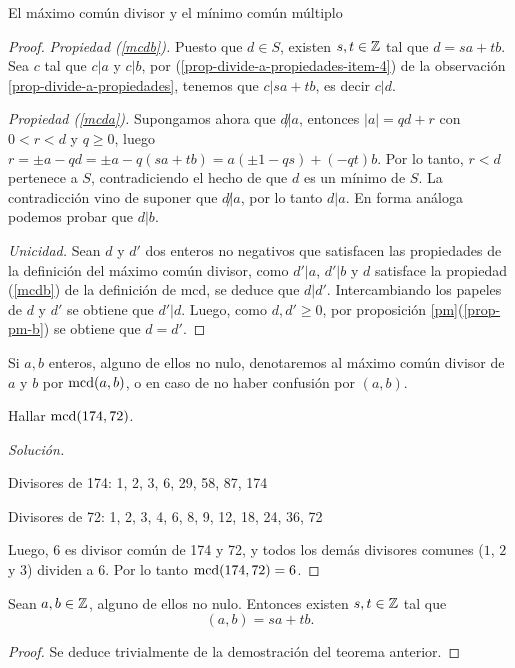 \begin{section}{El máximo común divisor y el mínimo común
múltiplo}
\begin{proof}
	\textit{Propiedad {(\ref{mcdb})}.} Puesto  que $d \in S$,  existen $s, t \in {\mathbb Z}$ tal que $d = sa+tb$. Sea $c$ tal que $c|a$ y $c|b$, por (\ref{prop-divide-a-propiedades-item-4}) de la observación \ref{prop-divide-a-propiedades},  tenemos que $c|sa+tb$,  es decir $c|d$. 
	
	\textit{Propiedad {(\ref{mcda})}.} Supongamos ahora que $d \not| a$,  entonces $|a| = qd + r$ con $0 < r <d$ y $q \ge 0$, luego $r = \pm a - qd = \pm a-q(sa+tb) = a(\pm1-qs) +(-qt)b$. Por lo tanto,  $r < d$  pertenece a $S$, contradiciendo  el hecho de que $d$  es un mínimo de $S$. La contradicción vino de suponer que  $d \not| a$, por lo tanto $d|a$. En  forma análoga podemos probar que $d|b$. 
	
	
	\textit{Unicidad.} Sean $d$ y $d'$ dos enteros no negativos que satisfacen las propiedades de la definición del máximo común divisor, como $d'|a$, $d'|b$ y  $d$ satisface la propiedad {(\ref{mcdb})} de la definición de mcd, se deduce que $d|d'$. Intercambiando  los papeles de $d$ y $d'$ se obtiene que $d'|d$. Luego, como $d,d'\ge 0$, por  proposición \ref{pm}(\ref{prop-pm-b}) se obtiene que $d=d'$.
\end{proof}

Si $a,b$ enteros,  alguno de ellos  no nulo,  denotaremos al máximo común divisor  de $a$ y $b$ por $\operatorname{mcd}(a,b)$, o en caso de no haber confusión por $(a,b)$.



\begin{ejemplo} Hallar   $\operatorname{mcd}(174,72)$.
	\begin{proof}[Solución] ${^{}}$
		
		Divisores de 174: 1, 2, 3, 6, 29, 58, 87, 174
		
		Divisores de 72: 1, 2, 3, 4, 6, 8, 9, 12, 18, 24, 36, 72 
		
		Luego, $6$ es divisor común de 174 y 72, y todos los demás divisores comunes ($1$, $2$ y $3$) dividen a $6$. Por lo tanto $\operatorname{mcd}(174,72) =6$.
	\end{proof}
\end{ejemplo}

\begin{proposicion}\label{prop-d-comb-lin}
	Sean $a,b \in {\mathbb Z}$, alguno de ellos no nulo. Entonces existen $s,t \in {\mathbb Z}$ tal que
	\begin{equation*}
	(a,b) = sa + tb. 
	\end{equation*}
\end{proposicion}
\begin{proof}
	Se deduce trivialmente de la demostración del teorema anterior. 
\end{proof}


\end{section}
